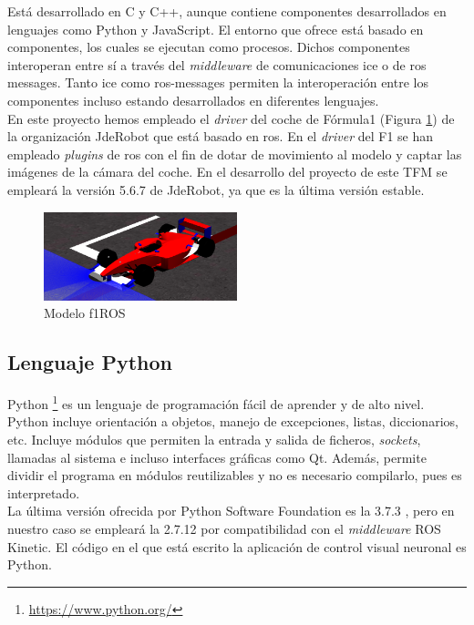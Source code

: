 Está desarrollado en C y C++, aunque contiene componentes desarrollados en lenguajes como Python y JavaScript. El entorno que ofrece está basado en componentes, los cuales se ejecutan como procesos. Dichos componentes interoperan entre sí a través del \textit{middleware} de comunicaciones \acrshort{ice} o de \acrshort{ros} messages. Tanto \acrshort{ice} como \acrshort{ros}-messages permiten la interoperación entre los componentes incluso estando desarrollados en diferentes lenguajes.\\

En este proyecto hemos empleado el \textit{driver} del coche de Fórmula1 (Figura \ref{fig.f1}) de la organización JdeRobot que está basado en \acrshort{ros}. En el \textit{driver} del F1 se han empleado \textit{plugins} de \acrshort{ros} con el fin de dotar de movimiento al modelo y captar las imágenes de la cámara del coche. En el desarrollo del proyecto de este TFM se empleará la versión 5.6.7 de JdeRobot, ya que es la última versión estable.


\begin{figure}
  \begin{center}
    \includegraphics[width=0.5\textwidth]{figures/Infraestructura/f1.png}
		\caption{Modelo f1ROS}
		\label{fig.f1}
		\end{center}
\end{figure}


\subsection{Lenguaje Python}

Python \footnote{\url{https://www.python.org/}} es un lenguaje de programación fácil de aprender y de alto nivel. Python incluye orientación a objetos, manejo de excepciones, listas, diccionarios, etc. Incluye módulos que permiten la entrada y salida de ficheros, \textit{sockets}, llamadas al sistema e incluso interfaces gráficas como Qt. Además, permite dividir el programa en módulos reutilizables y no es necesario compilarlo, pues es interpretado.\\

La última versión ofrecida por Python Software Foundation es la 3.7.3 , pero en nuestro caso se empleará la 2.7.12 por compatibilidad con  el \textit{middleware} ROS Kinetic. El código en el que está escrito la aplicación de control visual neuronal es Python.


